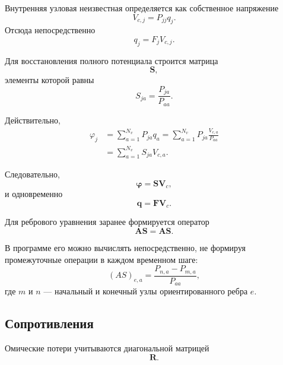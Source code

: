 \documentclass[12pt,a4paper]{article}
\newcommand{\vect}[1]{\boldsymbol{#1}}
\newcommand{\matr}[1]{\mathbf{#1}}
\begin{document}
Внутренняя узловая неизвестная определяется как собственное напряжение
\begin{equation}
    V_{c,j}
    =
    P_{jj}q_j.
\end{equation}
Отсюда непосредственно
\begin{equation}
    q_j
    =
    F_jV_{c,j}.
\end{equation}

Для восстановления полного потенциала строится матрица
\begin{equation}
    \matr S,
\end{equation}
элементы которой равны
\begin{equation}
    S_{ja}
    =
    \frac{P_{ja}}{P_{aa}}.
    \label{eq:S_definition}
\end{equation}

Действительно,
\begin{align}
    \varphi_j
    &=
    \sum_{a=1}^{N_v}
    P_{ja}q_a
    =
    \sum_{a=1}^{N_v}
    P_{ja}
    \frac{V_{c,a}}{P_{aa}}
    \nonumber\\
    &=
    \sum_{a=1}^{N_v}
    S_{ja}V_{c,a}.
\end{align}

Следовательно,
\begin{equation}
    \vect\varphi
    =
    \matr S\vect V_c,
\end{equation}
и одновременно
\begin{equation}
    \vect q
    =
    \matr F\vect V_c.
\end{equation}

Для ребрового уравнения заранее формируется оператор
\begin{equation}
    \matr{AS}
    =
    \matr A\matr S.
\end{equation}

В программе его можно вычислять непосредственно, не формируя
промежуточные операции в каждом временном шаге:
\begin{equation}
    (AS)_{e,a}
    =
    \frac{
        P_{n,a}-P_{m,a}
    }{
        P_{aa}
    },
\end{equation}
где $m$ и $n$ --- начальный и конечный узлы ориентированного ребра $e$.


\subsection{Сопротивления}

Омические потери учитываются диагональной матрицей
\begin{equation}
    \matr R.
\end{equation}
\end{document}
